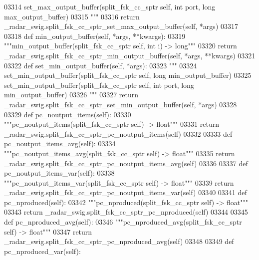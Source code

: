 \begin{DoxyCode}
{{{{{{{{{{{{03314 \textcolor{stringliteral}{        set\_max\_output\_buffer(split\_fsk\_cc\_sptr self, int port, long max\_output\_buffer)}
03315 \textcolor{stringliteral}{        """}
03316         \textcolor{keywordflow}{return} \_radar\_swig.split\_fsk\_cc\_sptr\_set\_max\_output\_buffer(self, *args)
03317 
03318     \textcolor{keyword}{def }min_output_buffer(self, *args, **kwargs):
03319         \textcolor{stringliteral}{"""min\_output\_buffer(split\_fsk\_cc\_sptr self, int i) -> long"""}
03320         \textcolor{keywordflow}{return} \_radar\_swig.split\_fsk\_cc\_sptr\_min\_output\_buffer(self, *args, **kwargs)
03321 
03322     \textcolor{keyword}{def }set_min_output_buffer(self, *args):
03323         \textcolor{stringliteral}{"""}
03324 \textcolor{stringliteral}{        set\_min\_output\_buffer(split\_fsk\_cc\_sptr self, long min\_output\_buffer)}
03325 \textcolor{stringliteral}{        set\_min\_output\_buffer(split\_fsk\_cc\_sptr self, int port, long min\_output\_buffer)}
03326 \textcolor{stringliteral}{        """}
03327         \textcolor{keywordflow}{return} \_radar\_swig.split\_fsk\_cc\_sptr\_set\_min\_output\_buffer(self, *args)
03328 
03329     \textcolor{keyword}{def }pc_noutput_items(self):
03330         \textcolor{stringliteral}{"""pc\_noutput\_items(split\_fsk\_cc\_sptr self) -> float"""}
03331         \textcolor{keywordflow}{return} \_radar\_swig.split\_fsk\_cc\_sptr\_pc\_noutput\_items(self)
03332 
03333     \textcolor{keyword}{def }pc_noutput_items_avg(self):
03334         \textcolor{stringliteral}{"""pc\_noutput\_items\_avg(split\_fsk\_cc\_sptr self) -> float"""}
03335         \textcolor{keywordflow}{return} \_radar\_swig.split\_fsk\_cc\_sptr\_pc\_noutput\_items\_avg(self)
03336 
03337     \textcolor{keyword}{def }pc_noutput_items_var(self):
03338         \textcolor{stringliteral}{"""pc\_noutput\_items\_var(split\_fsk\_cc\_sptr self) -> float"""}
03339         \textcolor{keywordflow}{return} \_radar\_swig.split\_fsk\_cc\_sptr\_pc\_noutput\_items\_var(self)
03340 
03341     \textcolor{keyword}{def }pc_nproduced(self):
03342         \textcolor{stringliteral}{"""pc\_nproduced(split\_fsk\_cc\_sptr self) -> float"""}
03343         \textcolor{keywordflow}{return} \_radar\_swig.split\_fsk\_cc\_sptr\_pc\_nproduced(self)
03344 
03345     \textcolor{keyword}{def }pc_nproduced_avg(self):
03346         \textcolor{stringliteral}{"""pc\_nproduced\_avg(split\_fsk\_cc\_sptr self) -> float"""}
03347         \textcolor{keywordflow}{return} \_radar\_swig.split\_fsk\_cc\_sptr\_pc\_nproduced\_avg(self)
03348 
03349     \textcolor{keyword}{def }pc_nproduced_var(self):
}}}}}}}}}}}}
\end{DoxyCode}
